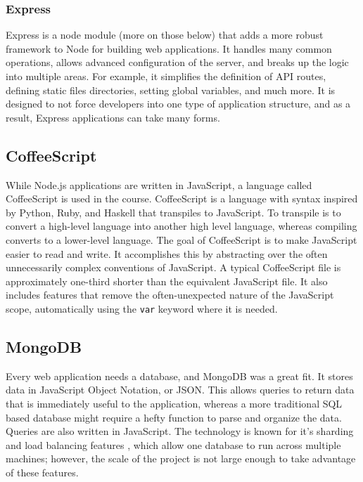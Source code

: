 \documentclass[12pt]{article}
\newcommand{\code}[1]{{\texttt {#1}}}
\begin{document}
\subsubsection{Express}\label{sec:express}
Express is a node module (more on those below) that adds a more robust framework to Node for building web applications. It handles many common operations, allows advanced configuration of the server, and breaks up the logic into multiple areas.  For example, it simplifies the definition of API routes, defining static files directories, setting global variables, and much more. It is designed to not force developers into one type of application structure, and as a result, Express applications can take many forms.


\subsection{CoffeeScript}\label{sec:coffee}
While Node.js applications are written in JavaScript, a language called CoffeeScript is used in the course. CoffeeScript is a language with syntax inspired by Python, Ruby, and Haskell that transpiles to JavaScript. To transpile is to convert a high-level language into another high level language, whereas compiling converts to a lower-level language. The goal of CoffeeScript is to make JavaScript easier to read and write. It accomplishes this by abstracting over the often unnecessarily complex conventions of JavaScript. A typical CoffeeScript file is approximately one-third shorter than the equivalent JavaScript file. It also includes features that remove the often-unexpected nature of the JavaScript scope, automatically using the \code{var} keyword where it is needed.


\subsection{MongoDB}\label{sec:mongo}
Every web application needs a database, and MongoDB was a great fit. It stores data in JavaScript Object Notation, or JSON. This allows queries to return data that is immediately useful to the application, whereas a more traditional SQL based database might require a hefty function to parse and organize the data. Queries are also written in JavaScript. The technology is known for it's sharding and load balancing features , which allow one database to run across multiple machines; however, the scale of the project is not large enough to take advantage of these features.
\end{document}
